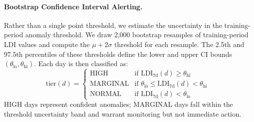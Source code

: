 \paragraph{Bootstrap Confidence Interval Alerting.}
Rather than a single point threshold, we estimate the uncertainty in the
training-period anomaly threshold.
We draw 2,000 bootstrap resamples of training-period LDI values and compute
the \(\mu + 2\sigma\) threshold for each resample.
The 2.5th and 97.5th percentiles of these thresholds define the lower and
upper CI bounds \((\theta_{\text{lo}}, \theta_{\text{hi}})\).
Each day is then classified as:
\[
\text{tier}(d) =
\begin{cases}
  \text{HIGH}     & \text{if } \text{LDI}_{7\text{d}}(d) \geq \theta_{\text{hi}} \\
  \text{MARGINAL} & \text{if } \theta_{\text{lo}} \leq \text{LDI}_{7\text{d}}(d) < \theta_{\text{hi}} \\
  \text{NORMAL}   & \text{if } \text{LDI}_{7\text{d}}(d) < \theta_{\text{lo}}
\end{cases}
\]
HIGH days represent confident anomalies; MARGINAL days fall within the
threshold uncertainty band and warrant monitoring but not immediate action.
